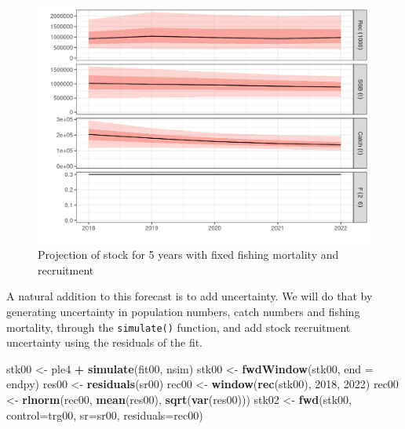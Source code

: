 \documentclass[
]{book}
\newenvironment{Shaded}{\begin{snugshade}}{\end{snugshade}}
\newcommand{\AttributeTok}[1]{\textcolor[rgb]{0.13,0.29,0.53}{#1}}
\newcommand{\DecValTok}[1]{\textcolor[rgb]{0.00,0.00,0.81}{#1}}
\newcommand{\FunctionTok}[1]{\textcolor[rgb]{0.13,0.29,0.53}{\textbf{#1}}}
\newcommand{\NormalTok}[1]{#1}
\newcommand{\OtherTok}[1]{\textcolor[rgb]{0.56,0.35,0.01}{#1}}
\newcommand{\SpecialCharTok}[1]{\textcolor[rgb]{0.81,0.36,0.00}{\textbf{#1}}}
\begin{document}
\begin{figure}
\centering
\includegraphics{_bookdown_files/_main_files/figure-html/unnamed-chunk-115-1.png}
\caption{\label{fig:unnamed-chunk-115}Projection of stock for 5 years with fixed fishing mortality and recruitment}
\end{figure}

A natural addition to this forecast is to add uncertainty. We will do that by generating uncertainty in population numbers, catch numbers and fishing mortality, through the \texttt{simulate()} function, and add stock recruitment uncertainty using the residuals of the fit.

\begin{Shaded}
\begin{Highlighting}[]
\NormalTok{stk00 }\OtherTok{\textless{}{-}}\NormalTok{ ple4 }\SpecialCharTok{+} \FunctionTok{simulate}\NormalTok{(fit00, nsim)}
\NormalTok{stk00 }\OtherTok{\textless{}{-}} \FunctionTok{fwdWindow}\NormalTok{(stk00, }\AttributeTok{end =}\NormalTok{ endpy)}
\NormalTok{res00 }\OtherTok{\textless{}{-}} \FunctionTok{residuals}\NormalTok{(sr00)}
\NormalTok{rec00 }\OtherTok{\textless{}{-}} \FunctionTok{window}\NormalTok{(}\FunctionTok{rec}\NormalTok{(stk00), }\DecValTok{2018}\NormalTok{, }\DecValTok{2022}\NormalTok{)}
\NormalTok{rec00 }\OtherTok{\textless{}{-}} \FunctionTok{rlnorm}\NormalTok{(rec00, }\FunctionTok{mean}\NormalTok{(res00), }\FunctionTok{sqrt}\NormalTok{(}\FunctionTok{var}\NormalTok{(res00)))}
\NormalTok{stk02 }\OtherTok{\textless{}{-}} \FunctionTok{fwd}\NormalTok{(stk00, }\AttributeTok{control=}\NormalTok{trg00, }\AttributeTok{sr=}\NormalTok{sr00, }\AttributeTok{residuals=}\NormalTok{rec00)}
\end{Highlighting}
\end{Shaded}
\end{document}
